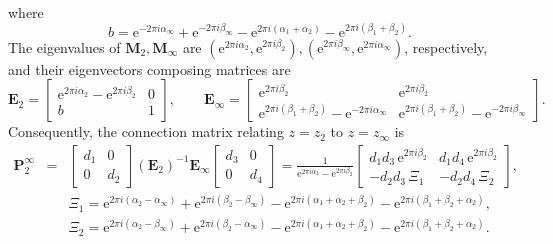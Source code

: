 \documentclass[aps,nofootinbib,superscriptaddress
]{revtex4}
\begin{document}
\begin{appendix}
\begin{eqnarray}
\end{eqnarray}
where
\begin{equation}
b = \mathrm{e}^{-2 \pi i \alpha_\infty} + \mathrm{e}^{-2 \pi i \beta_\infty} - \mathrm{e}^{2 \pi i (\alpha_1 + \alpha_2)} - \mathrm{e}^{2 \pi i (\beta_1 + \beta_2)}.
\end{equation}
The eigenvalues of $\mathbf{M}_2, \mathbf{M}_\infty$ are $(\mathrm{e}^{2 \pi i \alpha_2}, \mathrm{e}^{2 \pi i \beta_2}), (\mathrm{e}^{2 \pi i \beta_\infty}, \mathrm{e}^{2 \pi i \alpha_\infty})$, respectively, and their eigenvectors composing matrices are
\begin{equation}
\mathbf{E}_2 = \begin{bmatrix} \mathrm{e}^{2 \pi i \alpha_2} - \mathrm{e}^{2 \pi i \beta_2} & 0 \\ b & 1 \end{bmatrix}, \qquad \mathbf{E}_\infty = \begin{bmatrix} \mathrm{e}^{2 \pi i \beta_2} & \mathrm{e}^{2 \pi i \beta_2} \\ \mathrm{e}^{2 \pi i (\beta_1 + \beta_2)} - \mathrm{e}^{- 2 \pi i \alpha_\infty} & \mathrm{e}^{2 \pi i (\beta_1 + \beta_2)} - \mathrm{e}^{- 2 \pi i \beta_\infty} \end{bmatrix}.
\end{equation}
Consequently, the connection matrix relating $z = z_2$ to $z = z_\infty$ is
\begin{eqnarray} \label{eq_connec mat}
\mathbf{P}_2^\infty &=& \begin{bmatrix} d_1 & 0 \\ 0 & d_2 \end{bmatrix} (\mathbf{E}_2)^{-1} \mathbf{E}_\infty \begin{bmatrix} d_3 & 0 \\ 0 & d_4 \end{bmatrix} = \frac1{\mathrm{e}^{2 \pi i \alpha_2} - \mathrm{e}^{2 \pi i \beta_2}} \begin{bmatrix} d_1 d_3 \, \mathrm{e}^{2 \pi i \beta_2} & d_1 d_4 \, \mathrm{e}^{2 \pi i \beta_2} \\ - d_2 d_3 \, \Xi_1 & - d_2 d_4 \, \Xi_2 \end{bmatrix},
\\
&& \Xi_1 = \mathrm{e}^{2 \pi i (\alpha_2 - \alpha_\infty)} + \mathrm{e}^{2 \pi i (\beta_2 - \beta_\infty)}  - \mathrm{e}^{2 \pi i (\alpha_1 + \alpha_2 + \beta_2)} - \mathrm{e}^{2 \pi i (\beta_1 + \beta_2 + \alpha_2)},
\nonumber\\
&& \Xi_2 = \mathrm{e}^{2 \pi i (\alpha_2 - \beta_\infty)} + \mathrm{e}^{2 \pi i (\beta_2 - \alpha_\infty)} - \mathrm{e}^{2 \pi i (\alpha_1 + \alpha_2 + \beta_2)} - \mathrm{e}^{2 \pi i (\beta_1 + \beta_2 + \alpha_2)}.

\end{eqnarray}
\end{appendix}
\end{document}
